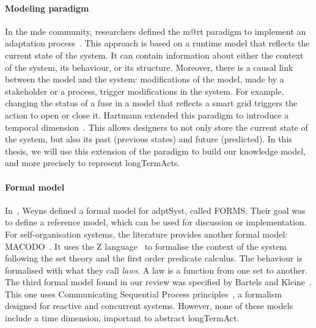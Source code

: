 \paragraph{Modeling paradigm}
In the \gls{mde} community, researchers defined the \gls{m@rt} paradigm to implement an adaptation process~\cite{DBLP:journals/computer/BlairBF09, DBLP:journals/computer/MorinBJFS09}.
This approach is based on a runtime model that reflects the current state of the system.
It can contain information about either the \gls{context} of the system, its \gls{behaviour}, or its \gls{structure}.
Moreover, there is a causal link between the model and the system: modifications of the model, made by a stakeholder or a process, trigger modifications in the system.
For example, changing the status of a fuse in a model that reflects a smart grid triggers the action to open or close it.
Hartmann \etal extended this paradigm to introduce a temporal dimension~\cite{DBLP:conf/seke/0001FNMKT14, DBLP:conf/models/0001FNMKBT14}.
This allows designers to not only store the current state of the system, but also its past (previous states) and future (predicted).
In this thesis, we will use this extension of the paradigm to build our knowledge model, and more precisely to represent \glspl{longTermAct}.

\paragraph{Formal model}
In~\cite{DBLP:journals/taas/WeynsMA12}, Weyns \etal defined a formal model for \gls{adptSyst}, called FORMS.
Their goal was to define a reference model, which can be used for discussion or implementation.
For self-organisation systems, the literature provides another formal model: MACODO~\cite{DBLP:journals/taas/WeynsHH10}.
It uses the Z language~\cite{DBLP:books/daglib/0011651} to formalise the context of the system following the set theory and the first order predicate calculus.
The \gls{behaviour} is formalised with what they call \textit{laws}.
A law is a function from one set to another.
The third formal model found in our review was specified by Bartels and Kleine~\cite{DBLP:conf/icse/BartelsK11}.
This one uses Communicating Sequential Process principles~\cite{DBLP:journals/cacm/Hoare78}, a formalism designed for reactive and concurrent systems.
However, none of these models include a time dimension, important to abstract \gls{longTermAct}.

